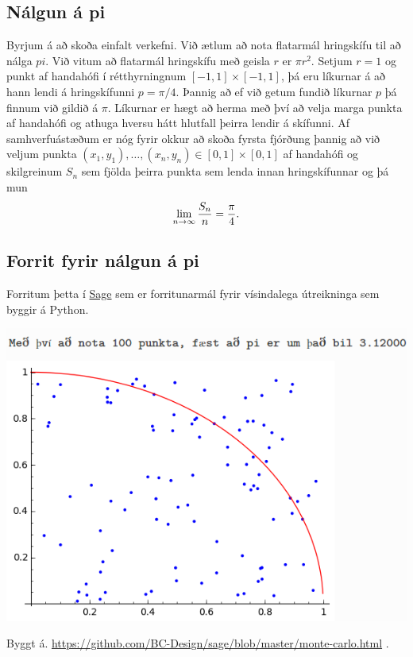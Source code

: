 \documentclass[letterpaper,10pt,icelandic]{sphinxmanual}
\begin{document}
\subsection{Nálgun á pi}
\label{kafli10:nalgun-a-pi}
Byrjum á að skoða einfalt verkefni. Við ætlum að nota flatarmál hringskífu til að
nálga \(pi\). Við vitum að flatarmál hringskífu með geisla \(r\) er \(\pi r^2\).
Setjum \(r=1\) og punkt af handahófi í rétthyrningnum \([-1,1]\times[-1,1]\), þá
eru líkurnar á að hann lendi á hringskífunni \(p=\pi/4\). Þannig að ef við
getum fundið líkurnar \(p\) þá finnum við gildið á \(\pi\). Líkurnar er hægt að herma
með því að velja marga punkta af handahófi og athuga hversu hátt hlutfall þeirra
lendir á skífunni. Af samhverfuástæðum er nóg fyrir okkur að skoða fyrsta fjórðung
þannig að við veljum punkta \((x_1,y_1),\ldots,(x_n,y_n) \in [0,1]\times[0,1]\)
af handahófi og skilgreinum \(S_n\) sem fjölda þeirra punkta sem lenda
innan hringskífunnar og þá mun
\begin{gather}
\begin{split}\lim_{n \to \infty} \frac{S_n}{n} = \frac{\pi}{4}.\end{split}\notag
\end{gather}

\subsection{Forrit fyrir nálgun á pi}
\label{kafli10:forrit-fyrir-nalgun-a-pi}
Forritum þetta í \href{https://www.sagemath.org}{Sage} sem er forritunarmál fyrir
vísindalega útreikninga sem byggir á Python.


\begin{center}
\includegraphics[width=8 cm,keepaspectratio=true]{pi.png}

\end{center}
Byggt á. \href{https://github.com/BC-Design/sage/blob/master/monte-carlo.html}{https://github.com/BC-Design/sage/blob/master/monte-carlo.html} .
\end{document}
